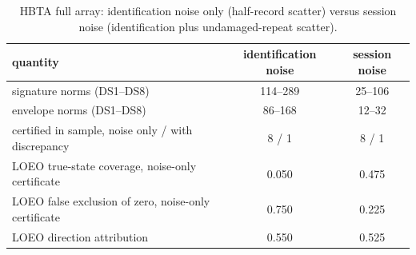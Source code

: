\begin{table}[h]\centering\footnotesize
\caption{HBTA full array: identification noise only (half-record scatter) versus session noise (identification plus undamaged-repeat scatter).}\label{tab:s13}
\begin{tabular}{lcc}\toprule quantity & identification noise & session noise\\ \midrule
signature norms (DS1--DS8) & 114--289 & 25--106 \\
envelope norms (DS1--DS8) & 86--168 & 12--32 \\
certified in sample, noise only / with discrepancy & 8 / 1 & 8 / 1 \\
LOEO true-state coverage, noise-only certificate & 0.050 & 0.475 \\
LOEO false exclusion of zero, noise-only certificate & 0.750 & 0.225 \\
LOEO direction attribution & 0.550 & 0.525 \\
\bottomrule\end{tabular}\end{table}